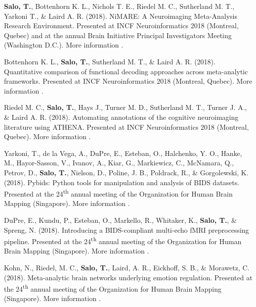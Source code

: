 \documentclass[10pt]{article}
\newcommand{\textlink}[3][blue]{\href{#2}{\color{#1}{#3}}}
\begin{document}
\begin{hangparas}{.25in}{1}

	\textbf{Salo, T.}, Bottenhorn K. L., Nichols T. E., Riedel M. C.,
	Sutherland M. T., Yarkoni T., \& Laird A. R. (2018).
	NiMARE: A Neuroimaging Meta-Analysis Research Environment.
	Presented at INCF Neuroinformatics 2018 (Montreal, Quebec) and at the annual
	Brain Initiative Principal Investigators Meeting (Washington D.C.).
	More information
	\textlink{https://f1000research.com/posters/7-1221}{here}.

	\bigskip

	Bottenhorn K. L., \textbf{Salo, T.}, Sutherland M. T., \& Laird A. R. (2018).
	Quantitative comparison of functional decoding approaches across meta-analytic
	frameworks.
	Presented at INCF Neuroinformatics 2018 (Montreal, Quebec).
	More information
	\textlink{https://f1000research.com/posters/7-1222}{here}.

	\bigskip

	Riedel M. C., \textbf{Salo, T.}, Hays J., Turner M. D., Sutherland M. T.,
	Turner J. A., \& Laird A. R. (2018).
	Automating annotations of the cognitive neuroimaging literature using ATHENA.
	Presented at INCF Neuroinformatics 2018 (Montreal, Quebec).
	More information
	\textlink{https://f1000research.com/posters/7-1229}{here}.

	\bigskip

	Yarkoni, T., de la Vega, A., DuPre, E., Esteban, O., Halchenko, Y. O.,
	Hanke, M., Hayor-Sasson, V., Ivanov, A., Kiar, G., Markiewicz, C., McNamara, Q.,
	Petrov, D., \textbf{Salo, T.}, Nielson, D., Poline, J. B., Poldrack, R.,
	\& Gorgolewski, K. (2018).
	Pybids: Python tools for manipulation and analysis of BIDS datasets.
	Presented at the 24\textsuperscript{th} annual meeting of the Organization
	for Human Brain Mapping (Singapore).
	More information
	\textlink{https://ww5.aievolution.com/hbm1801/index.cfm?do=abs.viewAbs&abs=3300}{here}.

	\bigskip

	DuPre, E., Kundu, P., Esteban, O., Markello, R., Whitaker, K.,
	\textbf{Salo, T.}, \& Spreng, N. (2018).
	Introducing a BIDS-compliant multi-echo fMRI preprocessing pipeline.
	Presented at the 24\textsuperscript{th} annual meeting of the Organization
	for Human Brain Mapping (Singapore).
	More information
	\textlink{https://ww5.aievolution.com/hbm1801/index.cfm?do=abs.viewAbs&abs=2789}{here}.

	\bigskip

	Kohn, N., Riedel, M. C., \textbf{Salo, T.}, Laird, A. R., Eickhoff, S. B.,
	\& Morawetz, C. (2018).
	Meta-analytic brain networks underlying emotion regulation.
	Presented at the 24\textsuperscript{th} annual meeting of the Organization
	for Human Brain Mapping (Singapore).
	More information
	\textlink{https://ww5.aievolution.com/hbm1801/index.cfm?do=abs.viewAbs&abs=1262}{here}.


\end{hangparas}
\end{document}

